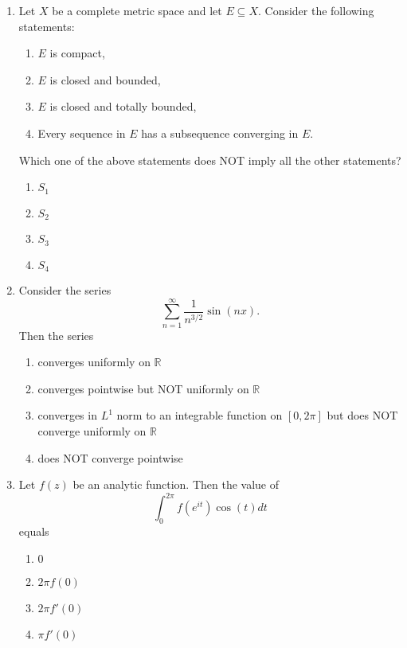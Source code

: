\documentclass[journal]{IEEEtran}
\newcommand{\brak}[1]{\left( #1 \right)}
\newcommand{\sbrak}[1]{\left[ #1 \right]}
\begin{document}
\begin{enumerate}
\item Let $X$ be a complete metric space and let $E \subseteq X$. Consider the following statements:
  \begin{enumerate}
    \item $E$ is compact,
    \item $E$ is closed and bounded,
    \item $E$ is closed and totally bounded,
    \item Every sequence in $E$ has a subsequence converging in $E$.
  \end{enumerate}
  Which one of the above statements does NOT imply all the other statements?

  \begin{multicols}{4}
  \begin{enumerate}
    \item $S_1$
    \item $S_2$
    \item $S_3$
    \item $S_4$
  \end{enumerate}
  \end{multicols}

\item Consider the series
  \[\sum_{n=1}^\infty \frac{1}{n^{3/2}}\sin\brak{nx}.\]
  Then the series

  \begin{enumerate}
    \item converges uniformly on $\mathbb{R}$
    \item converges pointwise but NOT uniformly on $\mathbb{R}$
    \item converges in $L^1$ norm to an integrable function on $\sbrak{0,2\pi}$ but does NOT
      converge uniformly on $\mathbb{R}$
    \item does NOT converge pointwise
  \end{enumerate}

\item Let $f\brak{z}$ be an analytic function. Then the value of
  \[\int_{0}^{2\pi} f\brak{e^{it}} \cos\brak{t} dt\]
  equals

  \begin{enumerate}
    \item $0$
    \item $2\pi f\brak{0}$
    \item $2\pi f'\brak{0}$
    \item $\pi f'\brak{0}$
  \end{enumerate}


\end{enumerate}
\end{document}

